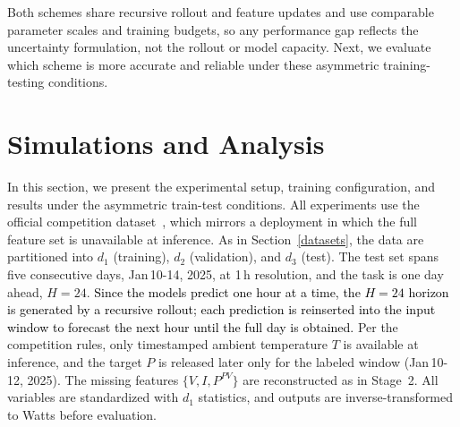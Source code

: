 \documentclass[final,10pt,1p,authoryear]{elsarticle}
\theoremstyle{definition}
\begin{document}
Both schemes share recursive rollout and feature updates and use comparable parameter scales and training budgets, so any performance gap reflects the uncertainty formulation, not the rollout or model capacity. Next, we evaluate which scheme is more accurate and reliable under these asymmetric training-testing conditions.

\section{Simulations and Analysis}\label{result}
In this section, we present the experimental setup, training configuration, and results under the asymmetric train-test conditions. All experiments use the official competition dataset~\citet{gomes_2024_14275645}, which mirrors a deployment in which the full feature set is unavailable at inference. As in Section~\ref{datasets}, the data are partitioned into $d_1$ (training), $d_2$ (validation), and $d_3$ (test). The test set spans five consecutive days, Jan\,10-14, 2025, at 1\,h resolution, and the task is one day ahead, $H=24$. \textcolor{black}{Since the models predict one hour at a time, the $H=24$ horizon is generated by a recursive rollout; each prediction is reinserted into the input window to forecast the next hour until the full day is obtained.} Per the competition rules, only timestamped ambient temperature $T$ is available at inference, and the target $P$ is released later only for the labeled window (Jan\,10-12, 2025). The missing features $\{V, I, P^{PV}\}$ are reconstructed as in Stage~2. All variables are standardized with $d_1$ statistics, and outputs are inverse-transformed to Watts before evaluation.
\end{document}
